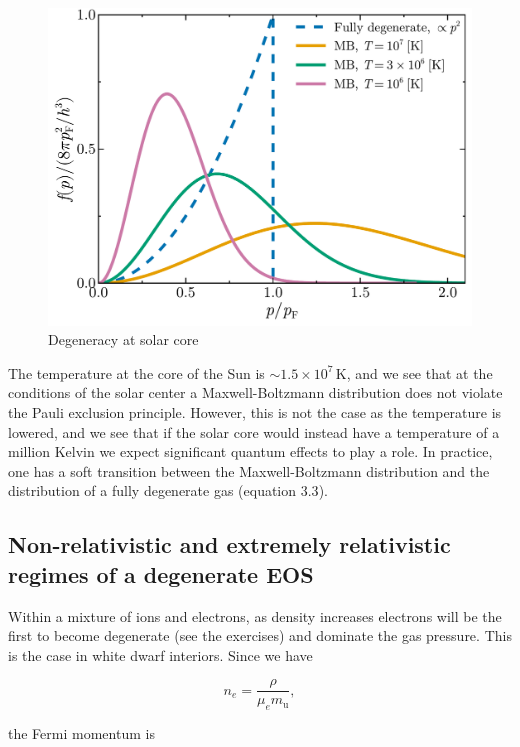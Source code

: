 \documentclass[twocolumn]{article}
\begin{document}
\begin{figure}
\centering
\includegraphics{../assets/4_eos2/degeneracy.pdf}
\caption{Degeneracy at solar core}
\end{figure}

The temperature at the core of the Sun is
\(\sim 1.5\times 10^7\,\mathrm{K}\), and we see that at the conditions
of the solar center a Maxwell-Boltzmann distribution does not violate
the Pauli exclusion principle. However, this is not the case as the
temperature is lowered, and we see that if the solar core would instead
have a temperature of a million Kelvin we expect significant quantum
effects to play a role. In practice, one has a soft transition between
the Maxwell-Boltzmann distribution and the distribution of a fully
degenerate gas (equation \(3.3\)).

\hypertarget{non-relativistic-and-extremely-relativistic-regimes-of-a-degenerate-eos}{%
\subsection{Non-relativistic and extremely relativistic regimes of a
degenerate
EOS}\label{non-relativistic-and-extremely-relativistic-regimes-of-a-degenerate-eos}}

Within a mixture of ions and electrons, as density increases electrons
will be the first to become degenerate (see the exercises) and dominate
the gas pressure. This is the case in white dwarf interiors. Since we
have

\[n_e = \frac{\rho}{\mu_e m_\mathrm{u}},\]

the Fermi momentum is
\end{document}
